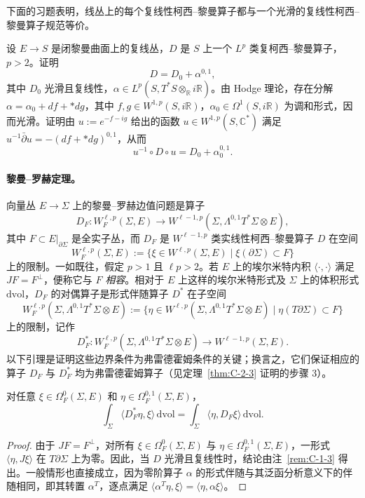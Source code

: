 下面的习题表明，线丛上的每个复线性柯西–黎曼算子都与一个光滑的复线性柯西–黎曼算子规范等价。

\begin{exercise}\label{ex:C-1-8}
设 $E\to S$ 是闭黎曼曲面上的复线丛，$D$ 是 $S$ 上一个 $L^p$ 类复柯西–黎曼算子，$p>2$。证明
\[
  D=D_0+\alpha^{0,1},
\]
其中 $D_0$ 光滑且复线性，$\alpha\in L^p(S,T^*S\otimes_{\mathbb R}i\mathbb R)$。由 Hodge 理论，存在分解 $\alpha=\alpha_0+df+*dg$，其中 $f,g\in W^{1,p}(S,i\mathbb R)$，$\alpha_0\in\Omega^1(S,i\mathbb R)$ 为调和形式，因而光滑。证明由 $u:=e^{-f-ig}$ 给出的函数 $u\in W^{1,p}(S,\mathbb C^*)$ 满足 $u^{-1}\bar\partial u=-(df+*dg)^{0,1}$，从而
\[
  u^{-1}\circ D\circ u=D_0+\alpha_0^{0,1}.
\]
\end{exercise}

\paragraph{黎曼--罗赫定理。} 向量丛 $E\to\Sigma$ 上的黎曼--罗赫边值问题是算子
\[
  D_F:W_F^{\ell,p}(\Sigma,E)
  \longrightarrow W^{\ell-1,p}(\Sigma,\Lambda^{0,1}T^*\Sigma\otimes E),
\]
其中 $F\subset E|_{\partial\Sigma}$ 是全实子丛，而 $D_F$ 是 $W^{\ell-1,p}$ 类实线性柯西–黎曼算子 $D$ 在空间
\[
  W_F^{\ell,p}(\Sigma,E):=
  \{\xi\in W^{\ell,p}(\Sigma,E)\mid\xi(\partial\Sigma)\subset F\}
\]
上的限制。一如既往，假定 $p>1$ 且 $\ell p>2$。若 $E$ 上的埃尔米特内积 $\langle\cdot,\cdot\rangle$ 满足 $JF=F^\perp$，便称它与 $F$ \emph{相容}。相对于 $E$ 上这样的埃尔米特形式及 $\Sigma$ 上的体积形式 $\mathrm{dvol}$，$D_F$ 的对偶算子是形式伴随算子 $D^*$ 在子空间
\[
  W_F^{\ell,p}(\Sigma,\Lambda^{0,1}T^*\Sigma\otimes E)
  :=\{\eta\in W^{\ell,p}(\Sigma,\Lambda^{0,1}T^*\Sigma\otimes E)
        \mid\eta(T\partial\Sigma)\subset F\}
\]
上的限制，记作
\[
  D_F^*:W_F^{\ell,p}(\Sigma,\Lambda^{0,1}T^*\Sigma\otimes E)
  \longrightarrow W^{\ell-1,p}(\Sigma,E).
\]
以下引理是证明这些边界条件为弗雷德霍姆条件的关键；换言之，它们保证相应的算子 $D_F$ 与 $D_F^*$ 均为弗雷德霍姆算子（见定理~\ref{thm:C-2-3} 证明的步骤 3）。

\begin{lemma}\label{lem:C-1-9}
对任意 $\xi\in\Omega_F^0(\Sigma,E)$ 和 $\eta\in\Omega_F^{0,1}(\Sigma,E)$，
\[
  \int_\Sigma\langle D_F^*\eta,\xi\rangle\,\mathrm{dvol}
  =\int_\Sigma\langle\eta,D_F\xi\rangle\,\mathrm{dvol}.
\]
\end{lemma}
\begin{proof}
由于 $JF=F^\perp$，对所有 $\xi\in\Omega_F^0(\Sigma,E)$ 与 $\eta\in\Omega_F^{0,1}(\Sigma,E)$，一形式 $\langle\eta,J\xi\rangle$ 在 $T\partial\Sigma$ 上为零。因此，当 $D$ 光滑且复线性时，结论由注~\ref{rem:C-1-3} 得出。一般情形也直接成立，因为零阶算子 $\alpha$ 的形式伴随与其泛函分析意义下的伴随相同，即其转置 $\alpha^T$，逐点满足 $\langle\alpha^T\eta,\xi\rangle=\langle\eta,\alpha\xi\rangle$。
\end{proof}


